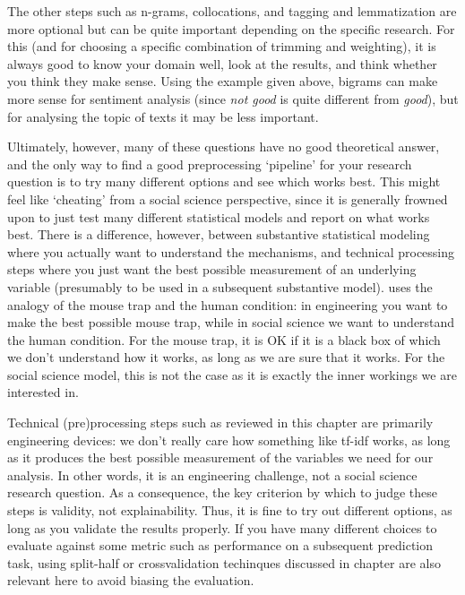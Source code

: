 The other steps such as n-grams, collocations, and tagging and lemmatization are more optional but can be quite important depending on the specific research.
For this (and for choosing a specific combination of trimming and weighting), it is always good to know your domain well, look at the results, and think whether you think they make sense.
Using the example given above, bigrams can make more sense for sentiment analysis (since \emph{not good} is quite different from \emph{good}),
but for analysing the topic of texts it may be less important.

Ultimately, however, many of these questions have no good theoretical answer, and the only way to find a good preprocessing `pipeline' for your research question is to try many different
options and see which works best.
This might feel like `cheating' from a social science perspective, since it is generally frowned upon to just test many different statistical models and report on what works best.
There is a difference, however, between substantive statistical modeling where you actually want to understand the mechanisms,
and technical processing steps where you just want the best possible measurement of an underlying variable (presumably to be used in a subsequent substantive model).
\citet{mousetrap} uses the analogy of the mouse trap and the human condition: in engineering you want to make the best possible mouse trap, 
while in social science we want to understand the human condition.
For the mouse trap, it is OK if it is a black box of which we don't understand how it works, as long as we are sure that it works.
For the social science model, this is not the case as it is exactly the inner workings we are interested in.

Technical (pre)processing steps such as reviewed in this chapter are primarily engineering devices:
we don't really care how something like tf-idf works, as long as it produces the best possible measurement of the variables we need for our analysis.
In other words, it is an engineering challenge, not a social science research question.
As a consequence, the key criterion by which to judge these steps is validity, not explainability.
Thus, it is fine to try out different options, as long as you validate the results properly.
If you have many different choices to evaluate against some metric such as performance on a subsequent prediction task,
using split-half or crossvalidation techinques discussed in chapter  are also relevant here to avoid biasing the evaluation.
